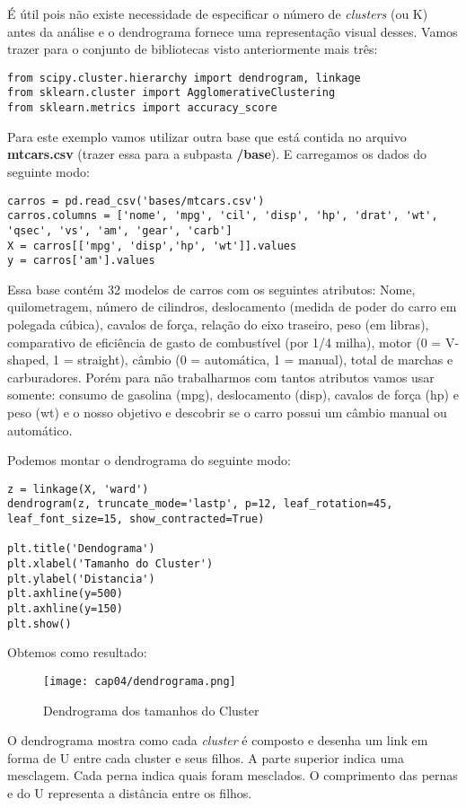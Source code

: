 É útil pois não existe necessidade de especificar o número de \textit{clusters} (ou K) antes da análise e o dendrograma fornece uma representação visual desses. Vamos trazer para o conjunto de bibliotecas visto anteriormente mais três:
\begin{lstlisting}[]
from scipy.cluster.hierarchy import dendrogram, linkage
from sklearn.cluster import AgglomerativeClustering
from sklearn.metrics import accuracy_score
\end{lstlisting}

Para este exemplo vamos utilizar outra base que está contida no arquivo \textbf{mtcars.csv} (trazer essa para a subpasta \textbf{/base}). E carregamos os dados do seguinte modo:
\begin{lstlisting}[]
carros = pd.read_csv('bases/mtcars.csv')
carros.columns = ['nome', 'mpg', 'cil', 'disp', 'hp', 'drat', 'wt', 'qsec', 'vs', 'am', 'gear', 'carb']
X = carros[['mpg', 'disp','hp', 'wt']].values
y = carros['am'].values
\end{lstlisting}

Essa base contém 32 modelos de carros com os seguintes atributos: Nome, quilometragem, número de cilindros, deslocamento (medida de poder do carro em polegada cúbica), cavalos de força, relação do eixo traseiro, peso (em libras), comparativo de eficiência de gasto de combustível (por 1/4 milha), motor (0 = V-shaped, 1 = straight), câmbio (0 = automática, 1 = manual), total de marchas e carburadores. Porém para não trabalharmos com tantos atributos vamos usar somente: consumo de gasolina (mpg), deslocamento (disp), cavalos de força (hp) e peso (wt) e o nosso objetivo e descobrir se o carro possui um câmbio manual ou automático.

Podemos montar o dendrograma do seguinte modo: 
\begin{lstlisting}[]
z = linkage(X, 'ward')
dendrogram(z, truncate_mode='lastp', p=12, leaf_rotation=45, leaf_font_size=15, show_contracted=True)

plt.title('Dendograma')
plt.xlabel('Tamanho do Cluster')
plt.ylabel('Distancia')
plt.axhline(y=500)
plt.axhline(y=150)
plt.show()
\end{lstlisting}

Obtemos como resultado:
\begin{figure}[H]
	\centering
	\texttt{[image: cap04/dendrograma.png]}
	\caption{Dendrograma dos tamanhos do Cluster}
\end{figure}

O dendrograma mostra como cada \textit{cluster} é composto e desenha um link em forma de U entre cada cluster e seus filhos. A parte superior indica uma mesclagem. Cada perna indica quais foram mesclados. O comprimento das pernas e do U representa a distância entre os filhos.

